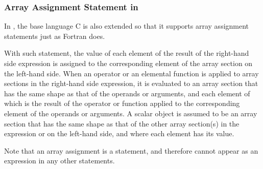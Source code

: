 \subsubsection{Array Assignment Statement in {\XMPC}}
\label{subsubsec:Array assignment statements in C}






In {\XMPC}, the base language C is also extended so that it supports
array assignment statements just as Fortran does.

With such statement, the value of each element of the result of the
right-hand side expression is assigned to the corresponding element of
the array section on the left-hand side.
%
When an operator or an elemental function
is applied to array sections in the right-hand side
expression, it is evaluated to an array section that has the same shape
as that of the operands or arguments, and each element of which is the
result of the operator or function applied to the corresponding element
of the operands or arguments. A scalar object is assumed to be an array
section that has the same shape as that of the other array section(s) in
the expression or on the left-hand side, and
where each element has its value.

Note that an array assignment is a statement, and therefore cannot
appear as an expression in any other statements.

